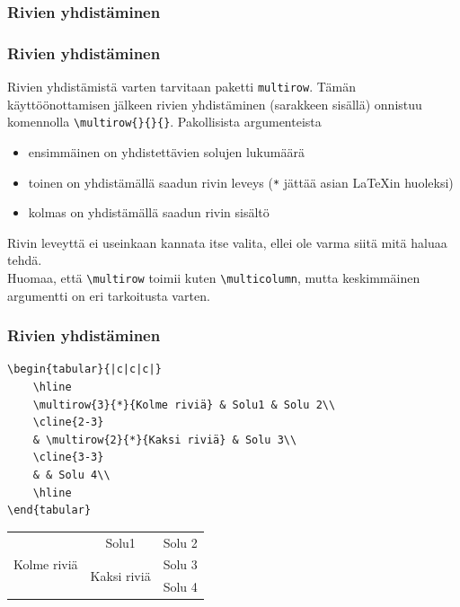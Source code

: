 \documentclass[handout,hyperref={colorlinks=true}]{beamer}
\theoremstyle{remark}
\newcommand{\vaihto}{\\ \vspace{10pt}}
\begin{document}
\subsubsection{Rivien yhdistäminen}
\begin{frame}[fragile]
    \frametitle{Rivien yhdistäminen}
    Rivien yhdistämistä varten tarvitaan paketti \verb-multirow-. Tämän käyttöönottamisen jälkeen rivien yhdistäminen (sarakkeen sisällä) onnistuu komennolla \verb-\multirow{}{}{}-. Pakollisista argumenteista
    \begin{itemize}
        \item ensimmäinen on yhdistettävien solujen lukumäärä
        \item toinen on yhdistämällä saadun rivin leveys (\verb-*- jättää asian \LaTeX in huoleksi)
        \item kolmas on yhdistämällä saadun rivin sisältö
    \end{itemize}
    Rivin leveyttä ei useinkaan kannata itse valita, ellei ole varma siitä mitä haluaa tehdä. 
    \vaihto
    Huomaa, että \verb-\multirow- toimii kuten \verb-\multicolumn-, mutta keskimmäinen argumentti on eri tarkoitusta varten.
\end{frame}
\begin{frame}[fragile]
    \frametitle{Rivien yhdistäminen} 
    \begin{scriptsize}
        \begin{Verbatim}[frame=single]
\begin{tabular}{|c|c|c|}
    \hline
    \multirow{3}{*}{Kolme riviä} & Solu1 & Solu 2\\
    \cline{2-3}
    & \multirow{2}{*}{Kaksi riviä} & Solu 3\\
    \cline{3-3}
    & & Solu 4\\
    \hline
\end{tabular}
        \end{Verbatim}
    \end{scriptsize}
    \begin{tabular}{|c|c|c|}
        \hline
        \multirow{3}{*}{Kolme riviä} & Solu1	& Solu 2\\\cline{2-3}
                                      & \multirow{2}{*}{Kaksi riviä}	& Solu 3\\\cline{3-3}
                                      & & Solu 4\\
        \hline
    \end{tabular}
\end{frame}
\end{document}
